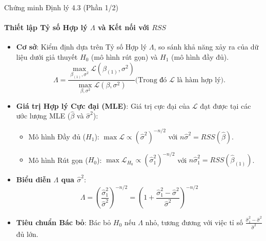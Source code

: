\begin{frame}{Chứng minh Định lý 4.3 (Phần 1/2)}
    \framesubtitle{Thiết lập Tỷ số Hợp lý $\Lambda$ và Kết nối với $RSS$}

    \begin{itemize}
        \item \textbf{Cơ sở}: Kiểm định dựa trên Tỷ số Hợp lý $\Lambda$, so sánh khả năng xảy ra của dữ liệu dưới giả thuyết $H_0$ (mô hình rút gọn) và $H_1$ (mô hình đầy đủ).
        \[
            \Lambda = \frac{\max_{\beta_{(1)},\sigma^{2}}\mathcal{L}(\beta_{(1)},\sigma^{2})}{\max_{\beta,\sigma^{2}}\mathcal{L}(\beta,\sigma^{2})} \text{(Trong đó $\mathcal{L}$ là hàm hợp lý).}
        \]  

        \item \textbf{Giá trị Hợp lý Cực đại (MLE)}: Giá trị cực đại của $\mathcal{L}$ đạt được tại các ước lượng MLE ($\hat{\beta}$ và $\hat{\sigma}^2$):
        \begin{itemize}
            \item Mô hình Đầy đủ ($H_1$): $\max \mathcal{L} \propto (\hat{\sigma}^2)^{-n/2}$ với $n\hat{\sigma}^2 = RSS(\hat{\beta})$.
            \item Mô hình Rút gọn ($H_0$): $\max \mathcal{L}_{H_0} \propto (\hat{\sigma}_1^2)^{-n/2}$ với $n\hat{\sigma}_1^2 = RSS(\hat{\beta}_{(1)})$.
        \end{itemize}

        \item \textbf{Biểu diễn $\Lambda$ qua $\hat{\sigma}^2$}:
        \[
            \Lambda = \left(\frac{\hat{\sigma}_1^2}{\hat{\sigma}^2}\right)^{-n/2} = \left(1 + \frac{\hat{\sigma}_1^2 - \hat{\sigma}^2}{\hat{\sigma}^2}\right)^{-n/2}
        \]
        \item \textbf{Tiêu chuẩn Bác bỏ}: Bác bỏ $H_0$ nếu $\Lambda$ nhỏ, tương đương với việc tỉ số $\frac{\hat{\sigma}_1^2 - \hat{\sigma}^2}{\hat{\sigma}^2}$ đủ lớn.
    \end{itemize}
\end{frame}
